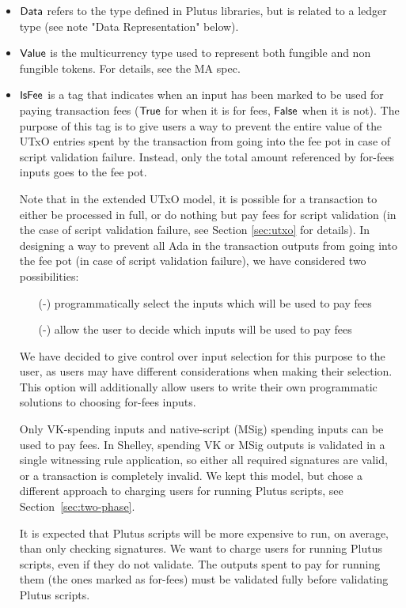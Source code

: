\begin{itemize}
  \item $\mathsf{Data}$ refers to the type defined in Plutus libraries, but is
  related to a ledger type (see note "Data Representation" below).

  \item $\mathsf{Value}$ is the multicurrency type used to represent
  both fungible and non fungible tokens. For details, see the MA spec.

  \item $\mathsf{IsFee}$ is a tag that indicates when an input has been marked
  to be used for paying transaction fees ($\mathsf{True}$ for when it is for fees,
  $\mathsf{False}$ when it is not). The purpose of this tag is to give users a way to prevent
  the entire value of the UTxO entries spent by the transaction
  from going into the fee pot in case of script validation failure.
  Instead, only the total amount referenced by for-fees inputs goes
  to the fee pot.

  Note that in the extended UTxO model, it is possible for a transaction
  to either be processed in full, or do nothing but pay fees for script
  validation (in the case of script validation failure, see Section
  \ref{sec:utxo} for details).
  In designing a way to prevent all Ada in the transaction outputs from going into
  the fee pot (in case of script validation failure), we have considered two
  possibilities:

  \begin{itemize}
    \item[(-)] programmatically select the inputs which will be used to pay fees
    \item[(-)] allow the user to decide which inputs will be used to pay fees
  \end{itemize}

  We have decided to give control over input selection for this purpose to the user,
  as users may have different considerations when making their selection. This
  option will additionally allow users to write their own programmatic solutions
  to choosing for-fees inputs.

  Only VK-spending inputs and native-script (MSig) spending inputs can
  be used to pay fees. In Shelley, spending VK or MSig outputs is
  validated in a single witnessing rule application, so either all
  required signatures are valid, or a transaction is completely
  invalid. We kept this model, but chose a different approach to
  charging users for running Plutus scripts, see
  Section~\ref{sec:two-phase}.

  It is expected that Plutus scripts will be more expensive to run, on
  average, than only checking signatures. We want to charge users for
  running Plutus scripts, even if they do not validate. The outputs
  spent to pay for running them (the ones marked as for-fees) must be
  validated fully before validating Plutus scripts.


\end{itemize}
